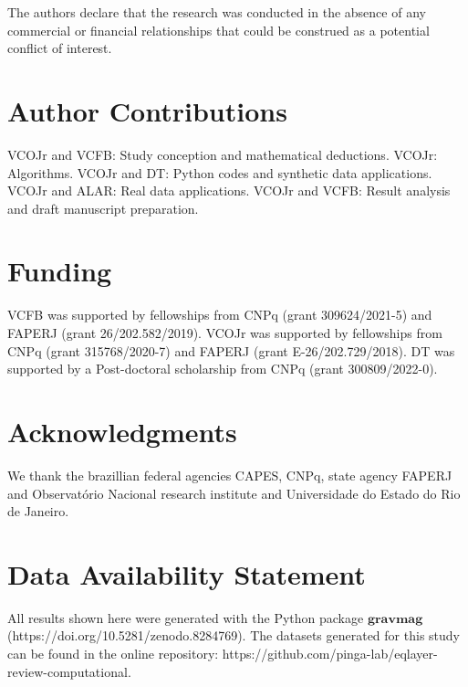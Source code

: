 \documentclass[utf8]{FrontiersinHarvard} %
\begin{document}
	The authors declare that the research was conducted in the absence of any commercial or financial relationships that could be construed as a potential conflict of interest.
	
	\section*{Author Contributions}
	
	VCOJr and VCFB: Study conception and mathematical deductions.
	VCOJr: Algorithms.
	VCOJr and DT: Python codes and synthetic data applications.
	VCOJr and ALAR: Real data applications.
	VCOJr and VCFB:  Result analysis and draft manuscript preparation.
	
	
	
	\section*{Funding}
	VCFB was supported by fellowships from CNPq (grant 309624/2021-5) and FAPERJ (grant 26/202.582/2019). 
	VCOJr was supported by fellowships from CNPq (grant 315768/2020-7) and FAPERJ (grant E-26/202.729/2018).
	DT was supported by a Post-doctoral scholarship from CNPq (grant 300809/2022-0).
	
	\section*{Acknowledgments}
	We thank the brazillian federal agencies CAPES, CNPq, state agency FAPERJ and Observatório Nacional research institute and Universidade do Estado do Rio de Janeiro.
	
	\section*{Data Availability Statement}
	All results shown here were generated with the Python package $\textbf{gravmag}$ (https://doi.org/10.5281/zenodo.8284769).
	The datasets generated for this study can be found in the online repository: https://github.com/pinga-lab/eqlayer-review-computational.
	
\end{document}
